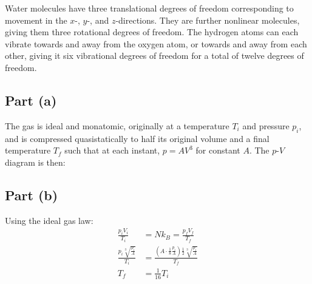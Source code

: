 \documentclass{article}
\begin{document}
\clearpage

Water molecules have three translational degrees of freedom corresponding to movement in the $x$-, $y$-, and $z$-directions. They are further nonlinear molecules, giving them three rotational degrees of freedom. The hydrogen atoms can each vibrate towards and away from the oxygen atom, or towards and away from each other, giving it six vibrational degrees of freedom for a total of twelve degrees of freedom.

\clearpage

\subsection*{Part (a)}
The gas is ideal and monatomic, originally at a temperature $T_i$ and pressure $p_i$, and is compressed quasistatically to half its original volume and a final temperature $T_f$ such that at each instant, $p = AV^3$ for constant $A$. The $p$-$V$ diagram is then:
\begin{center}
\end{center}
\subsection*{Part (b)}
Using the ideal gas law:
\begin{equation}
    \begin{split}
        \frac{p_iV_i}{T_i} & = Nk_B = \frac{p_fV_f}{T_f} \\
        \frac{p_i\sqrt[3]{\frac{p_i}{A}}}{T_i} & = \frac{(A \cdot \frac{1}{8}\frac{p_i}{A})\frac{1}{2}\sqrt[3]{\frac{p_i}{A}}}{T_f} \\
        T_f & = \frac{1}{16}T_i
    \end{split}
\end{equation}
\end{document}
